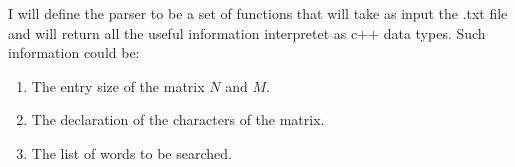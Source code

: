 \documentclass{extarticle}
\begin{document}
I will define the parser to be a set of functions that will take
as input the .txt file and will return all the useful information
interpretet as c++ data types. Such information could be:
    \begin{enumerate}
        \item The entry size of the matrix $N$ and $M$.
        \item The declaration of the characters of the matrix. 
        \item The list of words to be searched.
    \end{enumerate}
\end{document}

